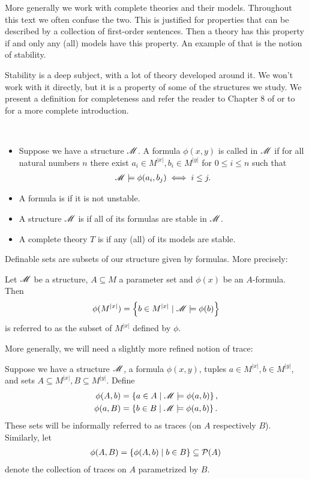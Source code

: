 More generally we work with complete theories and their models.
Throughout this text we often confuse the two.
This is justified for properties that can be described by a collection of first-order sentences.
Then a theory has this property if and only any (all) models have this property.
An example of that is the notion of stability.

Stability is a deep subject, with a lot of theory developed around it.
We won't work with it directly, but it is a property of some of the structures we study.
We present a definition for completeness and refer the reader to Chapter 8 of \cite{tent} or to \cite{pillay} for a more complete introduction.

\begin{Definition} \ 
  \begin{itemize}
  \item Suppose we have a structure $\mathscr M$.
    A formula $\phi(x,y)$ is called  in $\mathscr M$ if for all natural numbers $n$
    there exist $a_i \in M^{|x|}, b_i \in M^{|y|}$ for $0 \leq i \leq n$ such that
    \begin{align*}
      \mathscr M \models \phi(a_i, b_j) \iff i \leq j.
    \end{align*}
  \item A formula is  if it is not unstable.
  \item A structure $\mathscr M$ is  if all of its formulas are stable in $\mathscr M$.
  \item A complete theory $T$ is \defn{stable} if any (all) of its models are stable.
  \end{itemize}
\end{Definition}

Definable sets are subsets of our structure given by formulas.
More precisely:
\begin{Definition}
  Let $\mathscr M$ be a structure, $A \subseteq M$ a parameter set and  $\phi(x)$ be an $A$-formula.
  Then 
  \begin{align*}
    \phi(M^{|x|}) = \left\{b \in M^{|x|} \mid \mathscr M \models \phi(b)\right\}
  \end{align*}
  is referred to as the  subset of $M^{|x|}$ defined by $\phi$.
\end{Definition}

More generally, we will need a slightly more refined notion of trace:
\begin{Definition}
  Suppose we have a structure $\mathscr M$, a formula $\phi(x, y)$, tuples $a \in M^{|x|}, b \in M^{|y|}$, and
  sets $A \subseteq M^{|x|}, B \subseteq M^{|y|}$. 
  Define
  \begin{align*}
    \phi(A, b) &= \left\{a \in A \mid \mathscr M \models \phi(a,b)\right\}, \\
    \phi(a, B) &= \left\{b \in B \mid \mathscr M \models \phi(a,b)\right\}.
  \end{align*}
  These sets will be informally referred to as traces (on $A$ respectively $B$).
  Similarly, let
  \begin{align*}
    \phi(A, B) = \left\{\phi(A, b) \mid b \in B\right\} \subseteq \mathcal P(A)
  \end{align*}
  denote the collection of traces on $A$ parametrized by $B$.
\end{Definition}

